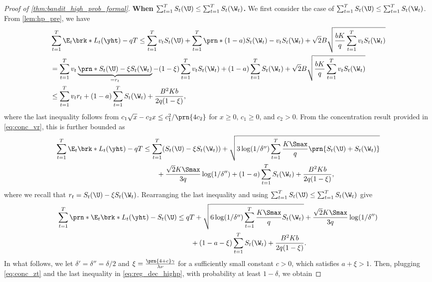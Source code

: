 \begin{proof}[Proof of \cref{thm:bandit_high_prob_formal}]
\textbf{When $\sum_{t=1}^T S_t(\U) \leq \sum_{t=1}^T S_t(\W_t)$.}
We first consider the case of $\sum_{t=1}^T S_t(\U) \leq \sum_{t=1}^T S_t(\W_t)$.
From \cref{lem:hp_pre}, we have
\begin{align}
    &\sum_{t=1}^T \E_t\brk*{L_t(\yht)} - q T
    \leq
    \sum_{t=1}^T v_t S_t(\U) 
    +
    \sum_{t=1}^T \prn*{ (1-a) S_t(\W_t) - v_t S_t(\W_t)  } 
    +
    \sqrt{2} B \sqrt{\frac{b K}{q} \sum_{t=1}^T v_t S_t(\W_t) }
    \nonumber \\
    &=
    \sum_{t=1}^T v_t \underbrace{\prn*{ S_t(\U) - \xi S_t(\W_t)  } }_{= r_t}
    -
    (1 - \xi) \sum_{t=1}^T v_t S_t(\W_t)
    +
    (1-a) \sum_{t=1}^T S_t(\W_t)
    +
    \sqrt{2} B \sqrt{\frac{b K}{q} \sum_{t=1}^T v_t S_t(\W_t) }
    \nonumber \\
    &\leq
    \sum_{t=1}^T v_t r_t
    +
    (1-a) \sum_{t=1}^T S_t(\W_t)
    +
    \frac{B^2 K b}{2 q (1 - \xi)},
    \nonumber
\end{align}
where the last inequality follows from 
$c_1\sqrt{x}-c_2x\leq{c_1^2}/\prn{4c_2}$ for $x \geq 0$, $c_1 \geq 0$, and $c_2 > 0$.
From the concentration result provided in \eqref{eq:conc_vr}, this is further bounded as
\begin{align}
    \sum_{t=1}^T \E_t\brk*{L_t(\yht)} - q T
    &\leq
    \sum_{t=1}^T (S_t(\U) - \xi S_t(\W_t))
    +
    \sqrt{3 \log (1/\delta'') \sum_{t=1}^T \frac{K \Smax}{q} \prn{S_t(\U) + S_t(\W_t)} }
    \nonumber \\
    &\qquad
    +
    \frac{\sqrt{2} K \Smax}{3q} \log(1/\delta'') 
    +
    (1-a) \sum_{t=1}^T S_t(\W_t)
    +
    \frac{B^2 K b}{2 q (1 - \xi)}
    ,
    \nonumber
\end{align}
where we recall that $r_t = S_t(\U) - \xi S_t(\W_t)$.
Rearranging the last inequality and using $\sum_{t=1}^T S_t(\U) \leq \sum_{t=1}^T S_t(\W_t)$ give
\begin{align}
    \sum_{t=1}^T \prn*{ \E_t\brk*{L_t(\yht)} - S_t(\U) } 
    &\leq
    q T 
    +
    \sqrt{6 \log (1/\delta'') \sum_{t=1}^T \frac{K \Smax}{q} S_t(\W_t) }
    +
    \frac{\sqrt{2} K \Smax}{3 q} \log(1/\delta'') 
    \nonumber \\
    &\qquad
    +
    (1 - a - \xi) \sum_{t=1}^T S_t(\W_t)
    +
    \frac{B^2 K b}{2 q (1 - \xi)}
    .
    \nonumber
\end{align}
In what follows, we let $\delta' = \delta'' = \delta / 2$ and $\xi = \frac{\prn{4 + c} \gamma}{\lambda \nu}$ for a sufficiently small constant $c > 0$, which satisfies $a + \xi > 1$.
Then, plugging \eqref{eq:conc_zt} and the last inequality in \eqref{eq:reg_dec_highp}, with probability at least $1 - \delta$, we obtain

\end{proof}
